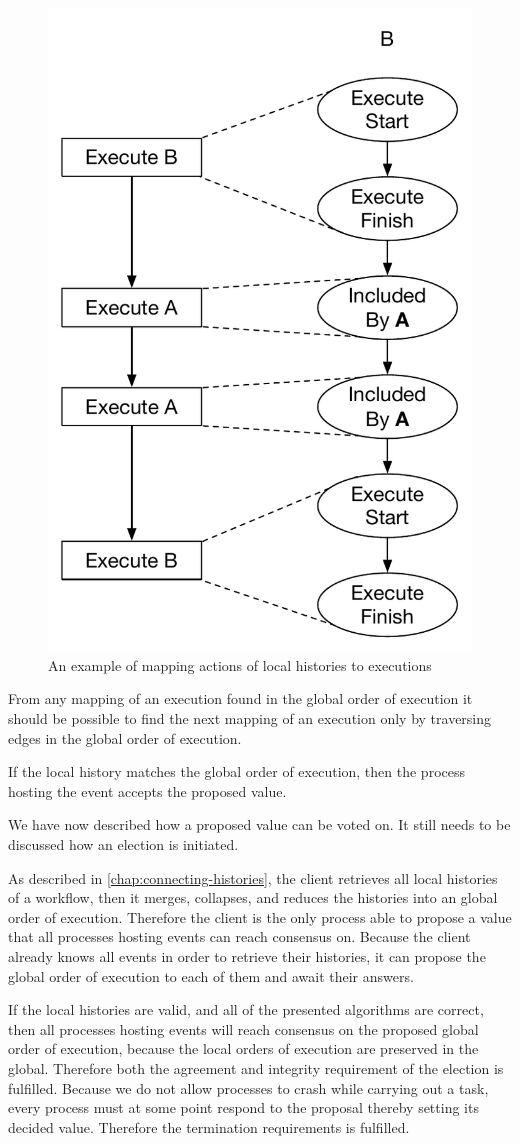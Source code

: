 	\begin{figure}[H]
		\centering
		\includegraphics[width=.4\textwidth]{5orderofexecution/images/election-mapping.pdf}
		\caption{An example of mapping actions of local histories to executions}
		\label{fig:orderofexecution:localmapping}
	\end{figure}
	
	\newpar From any mapping of an execution found in the global order of execution it should be possible to find the next mapping of an execution only by traversing edges in the global order of execution.
	
	If the local history matches the global order of execution, then the process hosting the event accepts the proposed value.
	
	\newpar We have now described how a proposed value can be voted on. It still needs to be discussed how an election is initiated.
	
	\newpar As described in \autoref{chap:connecting-histories}, the client retrieves all local histories of a workflow, then it merges, collapses, and reduces the histories into an global order of execution. Therefore the client is the only process able to propose a value that all processes hosting events can reach consensus on. Because the client already knows all events in order to retrieve their histories, it can propose the global order of execution to each of them and await their answers.
	
	\newpar If the local histories are valid, and all of the presented algorithms are correct, then all processes hosting events will reach consensus on the proposed global order of execution, because the local orders of execution are preserved in the global. Therefore both the agreement and integrity requirement of the election is fulfilled. Because we do not allow processes to crash while carrying out a task, every process must at some point respond to the proposal thereby setting its decided value. Therefore the termination requirements is fulfilled.
	
